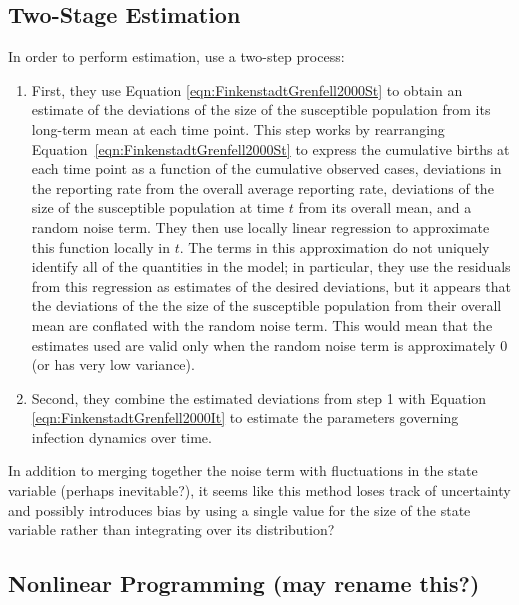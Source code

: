 \documentclass[fleqn]{article}\usepackage[]{graphicx}\usepackage[]{color}
\begin{document}
\subsection{Two-Stage Estimation}
\label{subsec:Estimation:TwoStage}

In order to perform estimation, \cite{finkenstadt2000TimeSeriesDiseasesDynamicalSystems} use a two-step process:
\begin{enumerate}
\item First, they use Equation \eqref{eqn:FinkenstadtGrenfell2000St} to obtain an estimate of the deviations of the size of the susceptible population from its long-term mean at each time point.  This step works by rearranging Equation~\eqref{eqn:FinkenstadtGrenfell2000St} to express the cumulative births at each time point as a function of the cumulative observed cases, deviations in the reporting rate from the overall average reporting rate, deviations of the size of the susceptible population at time $t$ from its overall mean, and a random noise term.  They then use locally linear regression to approximate this function locally in $t$.  The terms in this approximation do not uniquely identify all of the quantities in the model; in particular, they use the residuals from this regression as estimates of the desired deviations, but it appears that the deviations of the the size of the susceptible population from their overall mean are conflated with the random noise term.  This would mean that the estimates used are valid only when the random noise term is approximately $0$ (or has very low variance).
\item Second, they combine the estimated deviations from step 1 with Equation \eqref{eqn:FinkenstadtGrenfell2000It} to estimate the parameters governing infection dynamics over time.
\end{enumerate}

In addition to merging together the noise term with fluctuations in the state variable (perhaps inevitable?), it seems like this method loses track of uncertainty and possibly introduces bias by using a single value for the size of the state variable rather than integrating over its distribution?

\subsection{Nonlinear Programming (may rename this?)}
\label{subsec:Estimation:NonlinearProgramming}

\end{document}
